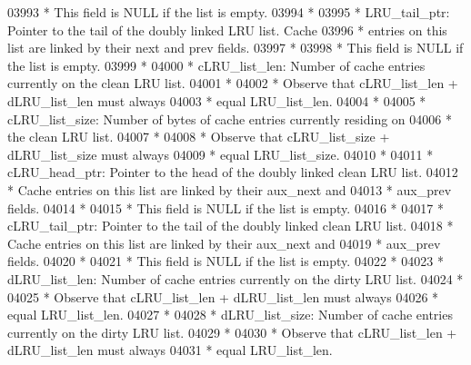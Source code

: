 \begin{DoxyCode}
03993 \textcolor{comment}{ *              This field is NULL if the list is empty.}
03994 \textcolor{comment}{ *}
03995 \textcolor{comment}{ * LRU\_tail\_ptr:  Pointer to the tail of the doubly linked LRU list.  Cache}
03996 \textcolor{comment}{ *              entries on this list are linked by their next and prev fields.}
03997 \textcolor{comment}{ *}
03998 \textcolor{comment}{ *              This field is NULL if the list is empty.}
03999 \textcolor{comment}{ *}
04000 \textcolor{comment}{ * cLRU\_list\_len: Number of cache entries currently on the clean LRU list.}
04001 \textcolor{comment}{ *}
04002 \textcolor{comment}{ *              Observe that cLRU\_list\_len + dLRU\_list\_len must always}
04003 \textcolor{comment}{ *              equal LRU\_list\_len.}
04004 \textcolor{comment}{ *}
04005 \textcolor{comment}{ * cLRU\_list\_size:  Number of bytes of cache entries currently residing on}
04006 \textcolor{comment}{ *              the clean LRU list.}
04007 \textcolor{comment}{ *}
04008 \textcolor{comment}{ *              Observe that cLRU\_list\_size + dLRU\_list\_size must always}
04009 \textcolor{comment}{ *              equal LRU\_list\_size.}
04010 \textcolor{comment}{ *}
04011 \textcolor{comment}{ * cLRU\_head\_ptr:  Pointer to the head of the doubly linked clean LRU list.}
04012 \textcolor{comment}{ *              Cache entries on this list are linked by their aux\_next and}
04013 \textcolor{comment}{ *              aux\_prev fields.}
04014 \textcolor{comment}{ *}
04015 \textcolor{comment}{ *              This field is NULL if the list is empty.}
04016 \textcolor{comment}{ *}
04017 \textcolor{comment}{ * cLRU\_tail\_ptr:  Pointer to the tail of the doubly linked clean LRU list.}
04018 \textcolor{comment}{ *              Cache entries on this list are linked by their aux\_next and}
04019 \textcolor{comment}{ *              aux\_prev fields.}
04020 \textcolor{comment}{ *}
04021 \textcolor{comment}{ *              This field is NULL if the list is empty.}
04022 \textcolor{comment}{ *}
04023 \textcolor{comment}{ * dLRU\_list\_len: Number of cache entries currently on the dirty LRU list.}
04024 \textcolor{comment}{ *}
04025 \textcolor{comment}{ *              Observe that cLRU\_list\_len + dLRU\_list\_len must always}
04026 \textcolor{comment}{ *              equal LRU\_list\_len.}
04027 \textcolor{comment}{ *}
04028 \textcolor{comment}{ * dLRU\_list\_size:  Number of cache entries currently on the dirty LRU list.}
04029 \textcolor{comment}{ *}
04030 \textcolor{comment}{ *              Observe that cLRU\_list\_len + dLRU\_list\_len must always}
04031 \textcolor{comment}{ *              equal LRU\_list\_len.}

\end{DoxyCode}
